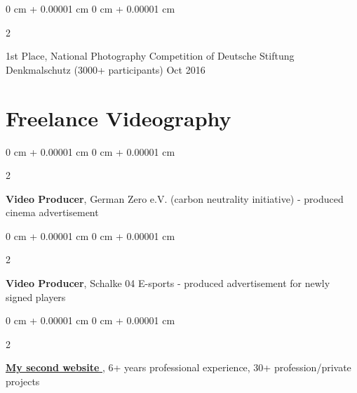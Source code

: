 \documentclass[10pt, letterpaper]{article}
\newenvironment{highlights}{
    \begin{itemize}[
        topsep=0.10 cm,
        parsep=0.10 cm,
        partopsep=0pt,
        itemsep=0pt,
        leftmargin=0 cm + 10pt
    ]
}{
    \end{itemize}
} %
\newenvironment{onecolentry}{
    \begin{adjustwidth}{
        0 cm + 0.00001 cm
    }{
        0 cm + 0.00001 cm
    }
}{
    \end{adjustwidth}
} %
\newenvironment{twocolentry}[2][]{
    \onecolentry
    \def\secondColumn{#2}
    \setcolumnwidth{\fill, 4.5 cm}
    \begin{paracol}{2}
}{
    \switchcolumn \raggedleft \secondColumn
    \end{paracol}
    \endonecolentry
} %
\begin{document}
        \vspace{0.2 cm}

        \begin{twocolentry}{
            Oct 2016
        }
            1st Place, National Photography Competition of Deutsche Stiftung Denkmalschutz (3000+ participants)\end{twocolentry}


    \section{Freelance Videography}

        \begin{twocolentry}{
            
        }
            \textbf{Video Producer}, German Zero e.V. (carbon neutrality initiative) - produced cinema advertisement \end{twocolentry}


        \begin{twocolentry}{
            
        }
            \textbf{Video Producer}, Schalke 04 E-sports - produced advertisement for newly signed players \end{twocolentry}

       \begin{twocolentry}{
            
        }
            \href{https://hollbeckg0.wixsite.com/gaborhollbeck}{\underline{\textbf{My second website }}}, 6+ years professional experience, 30+ profession/private projects  \end{twocolentry}

    
\end{document}
